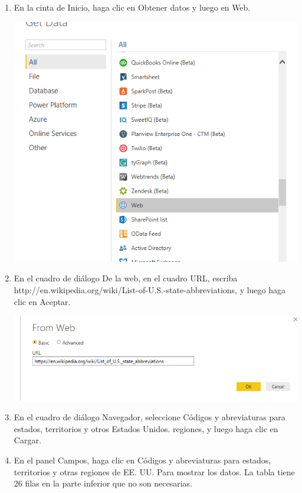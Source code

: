 \begin{enumerate}
    
    \item En la cinta de Inicio, haga clic en Obtener datos y luego en Web.

    \begin{center}
	\includegraphics[width=13cm]{./Imagenes/7}
	\end{center}

    \item En el cuadro de diálogo De la web, en el cuadro URL, escriba http://en.wikipedia.org/wiki/List-of-U.S.-state-abbreviations, y luego haga clic en Aceptar.
    
         \begin{center}
	\includegraphics[width=13cm]{./Imagenes/8}
	\end{center}
    
    \item En el cuadro de diálogo Navegador, seleccione Códigos y abreviaturas para estados, territorios y otros Estados Unidos. regiones, y luego haga clic en Cargar.
    
    
     \item En el panel Campos, haga clic en Códigos y abreviaturas para estados, territorios y otras regiones de EE. UU. Para mostrar los datos. La tabla tiene 26 filas en la parte inferior que no son necesarias.
    

\end{enumerate}
